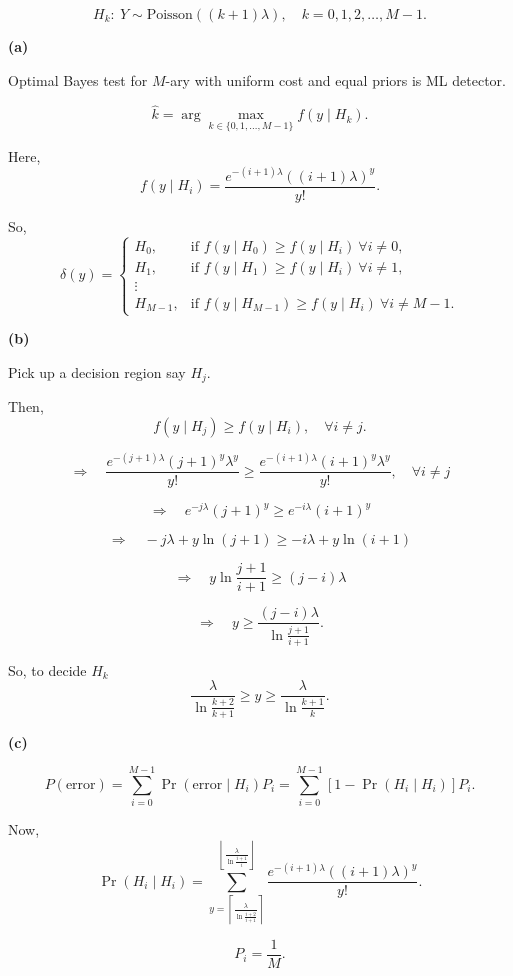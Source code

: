 \documentclass[12pt,a4paper,onecolumn]{exam}
\begin{document}
\begin{solution}

\[
H_k:\ Y\sim\text{Poisson}((k+1)\lambda),\quad k=0,1,2,\dots,M-1.
\]

\textbf{(a)}

Optimal Bayes test for $M$-ary with uniform cost and equal priors is ML detector.

\[
\hat{k}=\arg\max_{k\in\{0,1,\dots,M-1\}} f(y\mid H_k).
\]

Here,
\[
f(y\mid H_i)=\frac{e^{-(i+1)\lambda}((i+1)\lambda)^y}{y!}.
\]

So,
\[
\delta(y)=
\begin{cases}
H_0, & \text{if } f(y\mid H_0)\ge f(y\mid H_i)\ \forall i\ne 0,\\
H_1, & \text{if } f(y\mid H_1)\ge f(y\mid H_i)\ \forall i\ne 1,\\
\vdots\\
H_{M-1}, & \text{if } f(y\mid H_{M-1})\ge f(y\mid H_i)\ \forall i\ne M-1.
\end{cases}
\]

\textbf{(b)}

Pick up a decision region say $H_j$.

Then,
\[
f(y\mid H_j)\ge f(y\mid H_i),\quad \forall i\ne j.
\]

\[
\Rightarrow\quad
\frac{e^{-(j+1)\lambda}(j+1)^y\lambda^y}{y!}
\ge
\frac{e^{-(i+1)\lambda}(i+1)^y\lambda^y}{y!},\quad \forall i\ne j
\]

\[
\Rightarrow\quad
e^{-j\lambda}(j+1)^y\ge e^{-i\lambda}(i+1)^y
\]

\[
\Rightarrow\quad
-j\lambda+y\ln(j+1)\ge -i\lambda+y\ln(i+1)
\]

\[
\Rightarrow\quad
y\ln\frac{j+1}{i+1}\ge (j-i)\lambda
\]

\[
\Rightarrow\quad
y\ge \frac{(j-i)\lambda}{\ln\frac{j+1}{i+1}}.
\]

So, to decide $H_k$
\[
\frac{\lambda}{\ln\frac{k+2}{k+1}}\ge y\ge \frac{\lambda}{\ln\frac{k+1}{k}}.
\]

\textbf{(c)}

\[
P(\text{error})=\sum_{i=0}^{M-1}\Pr(\text{error}\mid H_i)P_i
=\sum_{i=0}^{M-1}\left[1-\Pr(H_i\mid H_i)\right]P_i.
\]

Now,
\[
\Pr(H_i\mid H_i)=
\sum_{y=\left\lceil \frac{\lambda}{\ln\frac{i+2}{i+1}}\right\rceil}^{\left\lfloor \frac{\lambda}{\ln\frac{i+1}{i}}\right\rfloor}
\frac{e^{-(i+1)\lambda}((i+1)\lambda)^y}{y!}.
\]

\[
P_i=\frac{1}{M}.
\]

\end{solution}
\end{document}
